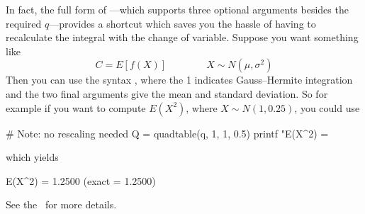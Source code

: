 In fact, the full form of ---which supports three
optional arguments besides the required
$q$---provides a shortcut which saves you the hassle of having to
recalculate the integral with the change of variable. Suppose you want
something like
\[
  C = E\left[f(X)\right] \qquad \mathrm \qquad X \sim N(\mu, \sigma^2)
\]
Then you can use the syntax , where the 1
indicates Gauss--Hermite integration and the two final arguments give
the mean and standard deviation. So for example if you want to compute
$E(X^2)$, where $X \sim N(1, 0.25)$, you could use
\begin{code}
# Note: no rescaling needed
Q = quadtable(q, 1, 1, 0.5)
printf "E(X^2) = %
\end{code}
which yields
\begin{code}
  E(X^2) = 1.2500 (exact = 1.2500)
\end{code}
See the \GCR\ for more details.

